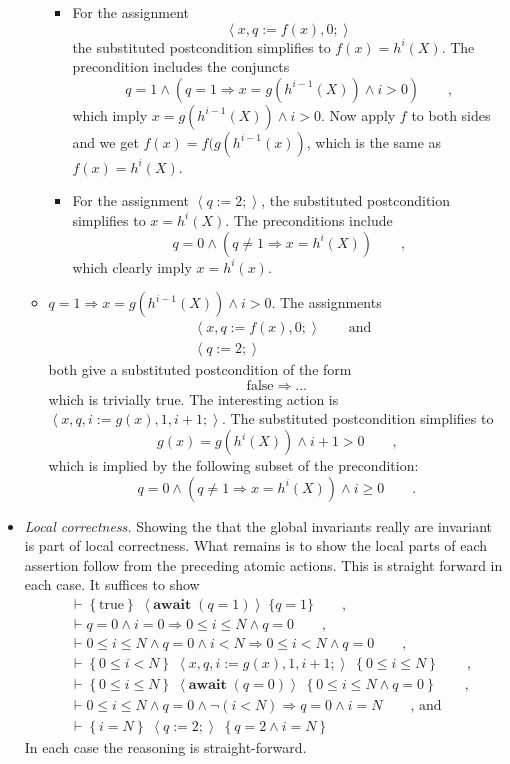 \documentclass[muchmore,11pt]{article}%
\begin{document}
\begin{itemize}
\begin{itemize}
\begin{itemize}
\item For the assignment%
\[
\left\langle x,q:=f(x),0;\right\rangle
\]
the substituted postcondition simplifies to $f(x)=h^{i}(X)$. The precondition
includes the conjuncts%
\[
q=1\wedge\left(  q=1\Rightarrow x=g(h^{i-1}(X))\wedge i>0\right)
\qquad\text{,}%
\]
which imply $x=g(h^{i-1}(X))\wedge i>0$. Now apply $f$ to both sides and we
get $f(x)=f(g(h^{i-1}(x))$, which is the same as $f(x)=h^{i}(X)$.

\item For the assignment $\left\langle q:=2;\right\rangle $, the substituted
postcondition simplifies to $x=h^{i}(X)$. The preconditions include%
\[
q=0\wedge\left(  q\neq1\Rightarrow x=h^{i}(X)\right)  \qquad\text{,}%
\]
which clearly imply $x=h^{i}(x)$.
\end{itemize}

\item $q=1\Rightarrow x=g(h^{i-1}(X))\wedge i>0$. The assignments
\begin{align*}
&  \left\langle x,q:=f(x),0;\right\rangle \qquad\text{and}\\
&  \left\langle q:=2;\right\rangle
\end{align*}
both give a substituted postcondition of the form%
\[
\mathrm{false}\Rightarrow...
\]
which is trivially true. The interesting action is $\left\langle
x,q,i:=g(x),1,i+1;\right\rangle $. The substituted postcondition simplifies
to
\[
g(x)=g(h^{i}(X))\wedge i+1>0\qquad\text{,}%
\]
which is implied by the following subset of the precondition:%
\[
q=0\wedge\left(  q\neq1\Rightarrow x=h^{i}(X)\right)  \wedge i\geq
0\qquad\text{.}%
\]

\end{itemize}

\item \emph{Local correctness.} Showing the that the global invariants really
are invariant is part of local correctness. What remains is to show the local
parts of each assertion follow from the preceding atomic actions. This is
straight forward in each case. It suffices to show%
\begin{align*}
&  \vdash\left\{  \mathrm{true}\right\}  \;\left\langle \mathbf{await}%
\;(q=1)\right\rangle \;\{q=1\}\qquad\text{,}\\
&  \vdash q=0\wedge i=0\Rightarrow0\leq i\leq N\wedge q=0\qquad\text{,}\\
&  \vdash0\leq i\leq N\wedge q=0\wedge i<N\Rightarrow0\leq i<N\wedge
q=0\qquad\text{,}\\
&  \vdash\left\{  0\leq i<N\right\}  \;\left\langle
x,q,i:=g(x),1,i+1;\right\rangle \;\left\{  0\leq i\leq N\right\}
\qquad\text{,}\\
&  \vdash\left\{  0\leq i\leq N\right\}  \;\left\langle \mathbf{await\;}%
(q=0)\right\rangle \;\left\{  0\leq i\leq N\wedge q=0\right\}  \qquad
\text{,}\\
&  \vdash0\leq i\leq N\wedge q=0\wedge\lnot\left(  i<N\right)  \Rightarrow
q=0\wedge i=N\qquad\text{, and}\\
&  \vdash\left\{  i=N\right\}  \;\left\langle q:=2;\right\rangle \;\left\{
q=2\wedge i=N\right\}
\end{align*}
In each case the reasoning is straight-forward.


\end{itemize}
\end{document}
